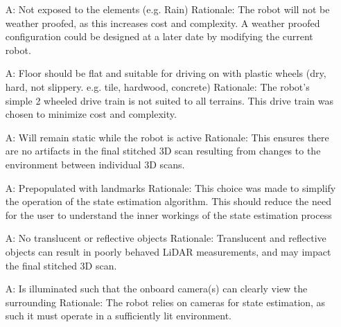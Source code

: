 \documentclass[12pt]{article}
\newcounter{assumpnum} %
\begin{document}
\noindent \begin{itemize}
\item[A\refstepcounter{assumpnum}\theassumpnum \label{Assumption1}:] Not exposed to the elements (e.g. Rain)
\newline Rationale: The robot will not be weather proofed, as this increases cost and complexity. A weather proofed configuration could be designed at a later date by modifying the current robot.

\item[A\refstepcounter{assumpnum}\theassumpnum \label{Assumption2}:] Floor should be flat and suitable for driving on with plastic wheels (dry, hard, not slippery. e.g. tile, hardwood, concrete)
\newline Rationale: The robot's simple 2 wheeled drive train is not suited to all terrains. This drive train was chosen to minimize cost and complexity.

\item[A\refstepcounter{assumpnum}\theassumpnum \label{Assumption3}:] Will remain static while the robot is active
\newline Rationale: This ensures there are no artifacts in the final stitched 3D scan resulting from changes to the environment between individual 3D scans.

\item[A\refstepcounter{assumpnum}\theassumpnum \label{Assumption4}:] Prepopulated with landmarks
\newline Rationale: This choice was made to simplify the operation of the state estimation algorithm. This should reduce the need for the user to understand the inner workings of the state estimation process

\item[A\refstepcounter{assumpnum}\theassumpnum \label{Assumption5}:] No translucent or reflective objects
\newline Rationale: Translucent and reflective objects can result in poorly behaved LiDAR measurements, and may impact the final stitched 3D scan.

\item[A\refstepcounter{assumpnum}\theassumpnum \label{Assumption6}:] Is illuminated such that the onboard camera(s) can clearly view the surrounding
\newline Rationale: The robot relies on cameras for state estimation, as such it must operate in a sufficiently lit environment. 

\end{itemize}
\end{document}
